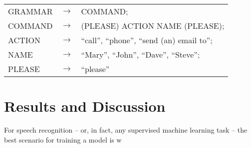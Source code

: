 \documentclass[twocolumn]{bmcart}%
\begin{document}
\begin{table}[!ht]
\begin{tabular}{|lll|} \hline
GRAMMAR & $\rightarrow$ & COMMAND; \\
COMMAND & $\rightarrow$ & (PLEASE) ACTION NAME (PLEASE); \\
ACTION & $\rightarrow$ & ``call'', ``phone'', ``send (an) email to''; \\
NAME & $\rightarrow$ & ``Mary'', ``John'', ``Dave'', ``Steve''; \\ 
PLEASE & $\rightarrow$ & ``please'' \\ \hline
\end{tabular}
\end{table}


\section*{Results and Discussion}

For speech recognition -- or, in fact, any supervised  machine learning task -- the best
scenario for training a model is w

\end{document}
